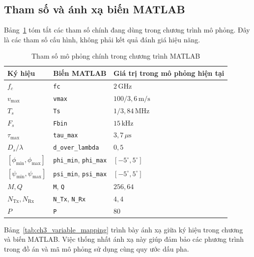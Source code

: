 \subsection{Tham số và ánh xạ biến MATLAB}
\label{subsec:ch3_matlab_mapping}

Bảng~\ref{tab:ch3_simulation_parameters} tóm tắt các tham số chính đang dùng trong chương trình mô phỏng. Đây là các tham số cấu hình, không phải kết quả đánh giá hiệu năng.

\begin{table}[H]
    \centering
    \small
    \caption{Tham số mô phỏng chính trong chương trình MATLAB}
    \label{tab:ch3_simulation_parameters}
    \begin{tabularx}{\textwidth}{l l X}
        \toprule
        Ký hiệu & Biến MATLAB & Giá trị trong mô phỏng hiện tại \\
        \midrule
        \(f_c\) & \texttt{fc} & \(2\,\mathrm{GHz}\) \\
        \(v_{\max}\) & \texttt{vmax} & \(100/3{,}6\,\mathrm{m/s}\) \\
        \(T_s\) & \texttt{Ts} & \(1/3{,}84\,\mathrm{MHz}\) \\
        \(F_s\) & \texttt{Fbin} & \(15\,\mathrm{kHz}\) \\
        \(\tau_{\max}\) & \texttt{tau\_max} & \(3{,}7\,\mu\mathrm{s}\) \\
        \(D_s/\lambda\) & \texttt{d\_over\_lambda} & \(0{,}5\) \\
        \([\phi_{\min},\phi_{\max}]\) & \texttt{phi\_min}, \texttt{phi\_max} & \([-5^\circ,5^\circ]\) \\
        \([\psi_{\min},\psi_{\max}]\) & \texttt{psi\_min}, \texttt{psi\_max} & \([-5^\circ,5^\circ]\) \\
        \(M,Q\) & \texttt{M}, \texttt{Q} & \(256,64\) \\
        \(N_{\mathrm{Tx}},N_{\mathrm{Rx}}\) & \texttt{N\_Tx}, \texttt{N\_Rx} & \(4,4\) \\
        \(P\) & \texttt{P} & \(80\) \\
        \bottomrule
    \end{tabularx}
\end{table}

Bảng~\ref{tab:ch3_variable_mapping} trình bày ánh xạ giữa ký hiệu trong chương và biến MATLAB. Việc thống nhất ánh xạ này giúp đảm bảo các phương trình trong đồ án và mã mô phỏng sử dụng cùng quy ước dấu pha.

